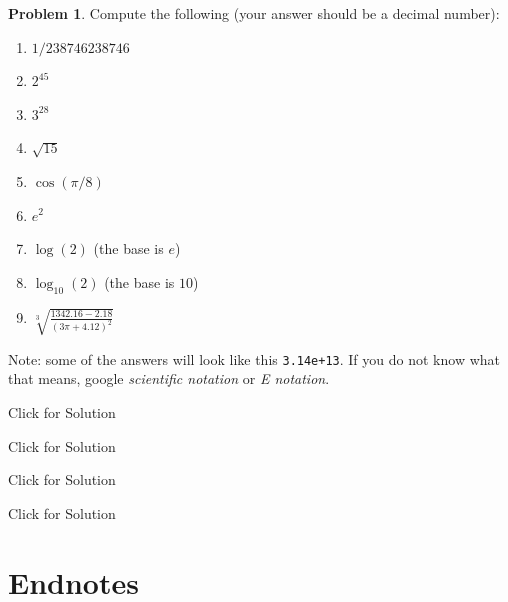 \documentclass[
]{book}
\providecommand{\tightlist}{%
  \setlength{\itemsep}{0pt}\setlength{\parskip}{0pt}}
\theoremstyle{definition}
\theoremstyle{definition}
\theoremstyle{definition}
\newtheorem{exercise}{Problem}[chapter]
\theoremstyle{definition}
\theoremstyle{remark}
\begin{document}
\begin{exercise}
Compute the following (your answer should be a decimal number):

\begin{enumerate}
\def\labelenumi{\alph{enumi})}
\tightlist
\item
  \(1/238746238746\)
\item
  \(2^{45}\)
\item
  \(3^{28}\)
\item
  \(\sqrt{15}\)
\item
  \(\cos(\pi/8)\)
\item
  \(e^2\)
\item
  \(\log(2)\) (the base is \(e\))
\item
  \(\log_{10}(2)\) (the base is \(10\))
\item
  \(\sqrt[3]{ \frac{1342.16-2.18}{(3 \pi + 4.12)^2}}\)
\end{enumerate}

Note: some of the answers will look like this \texttt{3.14e+13}. If you do not know what that means, google \emph{scientific notation} or \emph{E notation}.
\end{exercise}

Click for Solution

Click for Solution

Click for Solution

Click for Solution

\hypertarget{endnotes}{%
\section{Endnotes}\label{endnotes}}

\usepackage{mydefs_long}
\newcommand{\PP}{{\mathbb{P}}}
\newcommand{\N}{{\mathbb{N}}}
\newcommand{\Nz}{{\mathbb{N}_0}}

\newcommand{\bZ}{{\mathbb{Z}}}
\newcommand{\R}{{\mathbb{R}}}

\newcommand{\sS}{{\mathcal{S}}}
\newcommand{\EE}{{\mathbb{E}}}
\newcommand{\Var}{\operatorname{Var}}
\newcommand{\Cov}{\operatorname{Cov}}
\newcommand{\corr}{\operatorname{corr}}
\newcommand{\Id}{\operatorname{Id}}

\newcommand{\ld}{\lambda}
\newcommand{\eand}{\text{ and }}
\newcommand{\efor}{\text{ for }}
\newcommand{\eforall}{\text{ forall }}

\newcommand{\tot}{\tfrac{1}{2}}
\newcommand{\seqz}[1]{\{#1_n\}_{n\in \N_0}}
\newcommand{\abs}[1]{|#1|}
\newcommand{\set}[1]{\{#1\}}
\newcommand{\tf}[2]{\frac{#1}{#2}}
\newcommand{\ot}{\frac{1}{2}}
\newcommand{\oo}[1]{\frac{1}{#1}}
\newcommand{\eps}{\varepsilon}
\newcommand{\inds}[1]{\mathbf{1}_{\{#1\}}}
\newcommand{\sets}[2]{ \{ #1\, : \, #2\}}
\newcommand{\ft}[2]{#1,\dots, #2}
\newcommand{\seq}[1]{\{#1_n\}_{n\in\N}}
\newcommand{\ewhere}{\text{ where }}
\end{document}
